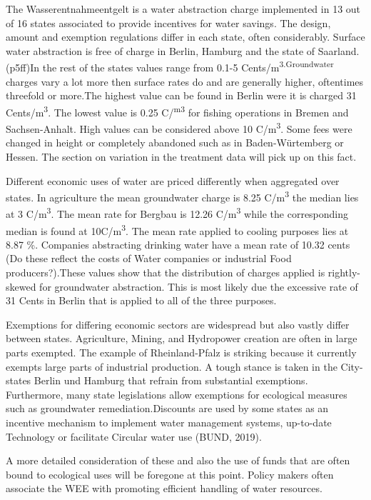 \documentclass[11pt]{article}
\begin{document}
The Wasserentnahmeentgelt is a water abstraction charge implemented in 13 out of 16 states associated to provide incentives for water savings. The design, amount and exemption regulations differ in each state, often considerably. Surface water abstraction is free of charge in Berlin, Hamburg and the state of Saarland.(p5ff)In the rest of the states values range from 0.1-5 Cents/m\textsuperscript{3.Groundwater} charges vary a lot more then surface rates do and are generally higher, oftentimes threefold or more.The highest value can be found in Berlin were it is charged 31 Cents/m\textsuperscript{3}. The lowest value is 0.25 C/\textsuperscript{m}\textsuperscript{3} for fishing operations in Bremen and Sachsen-Anhalt. High values can be considered above 10 C/m\textsuperscript{3}. Some fees were changed in height or completely abandoned such as in Baden-Würtemberg or Hessen. The section on variation in the treatment data will pick up on this fact.

Different economic uses of water are priced differently when aggregated over states. In agriculture the mean groundwater charge is 8.25 C/m\textsuperscript{3} the median lies at 3 C/m\textsuperscript{3}. The mean rate for Bergbau is 12.26 C/m\textsuperscript{3} while the corresponding median is found at 10C/m\textsuperscript{3}. The mean rate applied to cooling purposes lies at 8.87 \%. Companies abstracting drinking water have a mean rate of 10.32 cents (Do these reflect the costs of Water companies or industrial Food producers?).These values show that the distribution of charges applied is rightly-skewed for groundwater abstraction. This is most likely due the excessive rate of 31 Cents in Berlin that is applied to all of the three purposes.

Exemptions for differing economic sectors are widespread but also vastly differ between states. Agriculture, Mining, and Hydropower creation are often in large parts exempted. The example of Rheinland-Pfalz is striking because it currently exempts large parts of industrial production. A tough stance is taken in the City-states Berlin und Hamburg that refrain from substantial exemptions. Furthermore, many state legislations allow exemptions for ecological measures such as groundwater remediation.Discounts are used by some states as an incentive mechanism to implement water management systems, up-to-date Technology or facilitate Circular water use (BUND, 2019).

A more detailed consideration of these and also the use of funds that are often bound to ecological uses will be foregone at this point. Policy makers often associate the WEE with promoting efficient handling of water resources.
\end{document}

